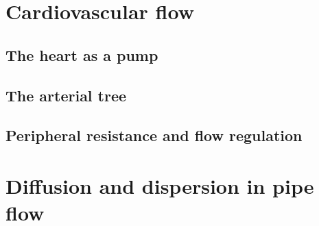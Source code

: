 \documentclass[a4paper,11pt]		{report}
\begin{document}
\chapter{Cardiovascular flow}
\label{ch.cardio}

\section{The heart as a pump}

\section{The arterial tree}

\section{Peripheral resistance and flow regulation}

\chapter{Diffusion and dispersion in pipe flow}
\label{ch.disper}





\end{document}
